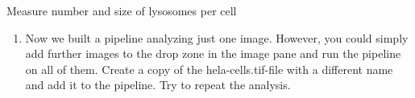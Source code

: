 \begin{taskbox}{Measure number and size of lysosomes per cell}
\begin{enumerate}
When you run the analysis again, you should obtain an image with the outlines of cells and
lysosomes labeled with the measured size of the lysosomes.

\item Now we built a pipeline analyzing just one image. However, you could simply add further images to the
drop zone in the image pane and run the pipeline on all of them. Create a copy of the hela-cells.tif-file
with a different name and add it to the pipeline. Try to repeat
the analysis.

	
\end{enumerate}

\end{taskbox}









